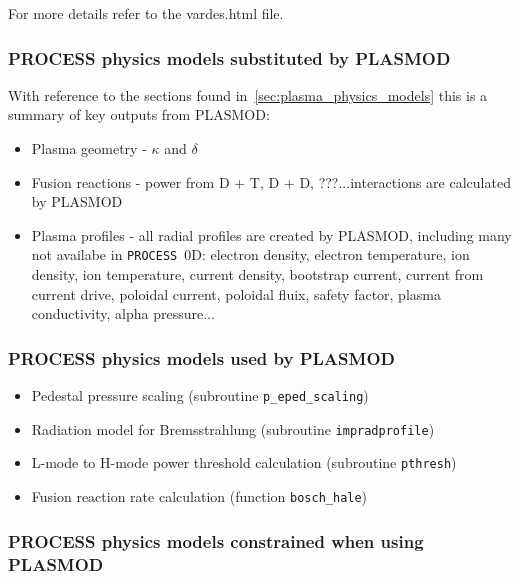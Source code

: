 \documentclass[11pt,a4paper]{report}
\newcommand{\process}{\mbox{\texttt{PROCESS}}}
\begin{document}
For more details refer to the vardes.html file.

\subsubsection*{PROCESS physics models substituted by PLASMOD}
With reference to the sections found in~\ref{sec:plasma_physics_models} this is a summary of key outputs from PLASMOD:

\begin{itemize}
\item Plasma geometry - $\kappa$ and $\delta$
\item Fusion reactions - power from D + T, D + D, ???...interactions are calculated by PLASMOD
\item Plasma profiles - all radial profiles are created by PLASMOD, including many not availabe in \process\ 0D: electron density, electron temperature, ion density, ion temperature, current density, bootstrap current, current from current drive, poloidal current, poloidal fluix, safety factor, plasma conductivity, alpha pressure...
\end{itemize}

\subsubsection*{PROCESS physics models used by PLASMOD}

\begin{itemize}
\item Pedestal pressure scaling (subroutine \texttt{p\_eped\_scaling})
\item Radiation model for Bremsstrahlung (subroutine \texttt{impradprofile})
\item L-mode to H-mode power threshold calculation (subroutine \texttt{pthresh})
\item Fusion reaction rate calculation (function \texttt{bosch\_hale})
\end{itemize}

\subsubsection*{PROCESS physics models constrained when using PLASMOD}
\end{document}
